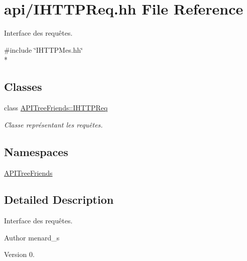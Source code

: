 \hypertarget{_i_h_t_t_p_req_8hh}{}\section{api/\+I\+H\+T\+T\+P\+Req.hh File Reference}
\label{_i_h_t_t_p_req_8hh}


Interface des requêtes.  


{\ttfamily \#include \char`\"{}I\+H\+T\+T\+P\+Mes.\+hh\char`\"{}}\\*
\subsection*{Classes}
\begin{DoxyCompactItemize}
\item 
class \hyperlink{class_a_p_i_tree_friends_1_1_i_h_t_t_p_req}{A\+P\+I\+Tree\+Friends\+::\+I\+H\+T\+T\+P\+Req}
\begin{DoxyCompactList}\small\item\em Classe représentant les requêtes. \end{DoxyCompactList}\end{DoxyCompactItemize}
\subsection*{Namespaces}
\begin{DoxyCompactItemize}
\item 
 \hyperlink{namespace_a_p_i_tree_friends}{A\+P\+I\+Tree\+Friends}
\end{DoxyCompactItemize}


\subsection{Detailed Description}
Interface des requêtes. 

\begin{DoxyAuthor}{Author}
menard\+\_\+s 
\end{DoxyAuthor}
\begin{DoxyVersion}{Version}
0. 
\end{DoxyVersion}
